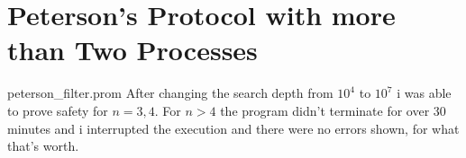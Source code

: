 
\section{Peterson's Protocol with more than Two Processes}
 {peterson_filter.prom}
After changing the search depth from $10^4$ to $10^7$ i was able to prove safety for $n=3,4$. For $n>4$ the program didn't terminate for over 30 minutes and i interrupted the execution and there were no errors shown, for what that's worth.
